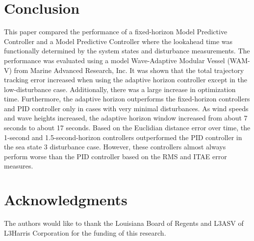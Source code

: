 \documentclass[letterpaper, 10 pt, conference]{ieeeconf}  %
\begin{document}
\section{Conclusion}
This paper compared the performance of a fixed-horizon Model Predictive Controller and a Model Predictive Controller where the lookahead time was functionally determined by the system states and disturbance measurements. The performance was evaluated using a model Wave-Adaptive Modular Vessel (WAM-V) from Marine Advanced Research, Inc. It was shown that the total trajectory tracking error increased when using the adaptive horizon controller except in the low-disturbance case. Additionally, there was a large increase in optimization time. Furthermore, the adaptive horizon outperforms the fixed-horizon controllers and PID controller only in cases with very minimal disturbances. As wind speeds and wave heights increased, the adaptive horizon window increased from about 7 seconds to about 17 seconds. Based on the Euclidian distance error over time, the 1-second and 1.5-second-horizon controllers outperformed the PID controller in the sea state 3 disturbance case. However, these controllers almost always perform worse than the PID controller based on the RMS and ITAE error measures.


\section*{Acknowledgments}
The authors would like to thank the Louisiana Board of Regents and L3ASV of L3Harris Corporation for the funding of this research.

\end{document}
